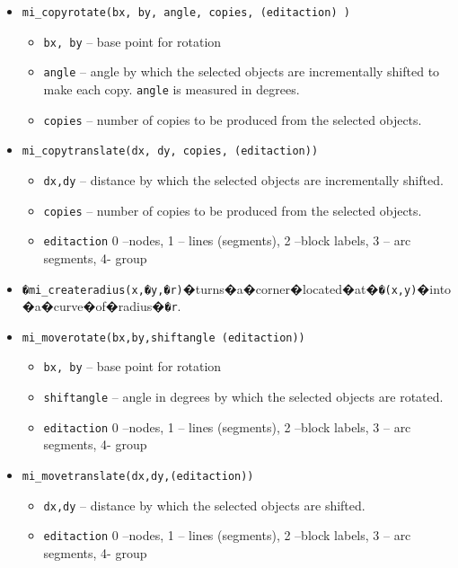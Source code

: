 \begin{itemize}
\item{\tt mi\_copyrotate(bx, by, angle, copies, (editaction) )}
        \begin{itemize}
        \item{\tt bx, by} -- base point for rotation
        \item{\tt angle} -- angle by which the selected objects are incrementally
        shifted to make each copy.  {\tt angle} is measured in degrees.
        \item{\tt copies} -- number of copies to be produced from
        the selected objects.

        \end{itemize}

\item{\tt mi\_copytranslate(dx, dy, copies, (editaction))}
        \begin{itemize}
        \item{\tt dx,dy} -- distance by which the selected objects are incrementally shifted.
        \item{\tt copies} -- number of copies to be produced from the selected objects.
        \item{\tt editaction}  0 --nodes, 1 -- lines (segments), 2 --block labels, 3 -- arc
                segments, 4- group
        \end{itemize}

\item{\tt�mi\_createradius(x,�y,�r)}�turns�a�corner�located�at�{\tt�(x,y)}�into�a�curve�of�radius�{\tt�r}.

\item{\tt mi\_moverotate(bx,by,shiftangle (editaction))}
        \begin{itemize}
        \item{\tt bx, by} -- base point for rotation
        \item{\tt shiftangle} -- angle in degrees by which the selected objects are rotated.
        \item{\tt editaction}  0 --nodes, 1 -- lines (segments), 2 --block labels, 3 -- arc
                segments, 4- group
        \end{itemize}

\item{\tt mi\_movetranslate(dx,dy,(editaction))}
        \begin{itemize}
        \item{\tt dx,dy} -- distance by which the selected objects are shifted.
        \item{\tt editaction}  0 --nodes, 1 -- lines (segments), 2 --block labels, 3 -- arc
                segments, 4- group
        \end{itemize}


\end{itemize}
